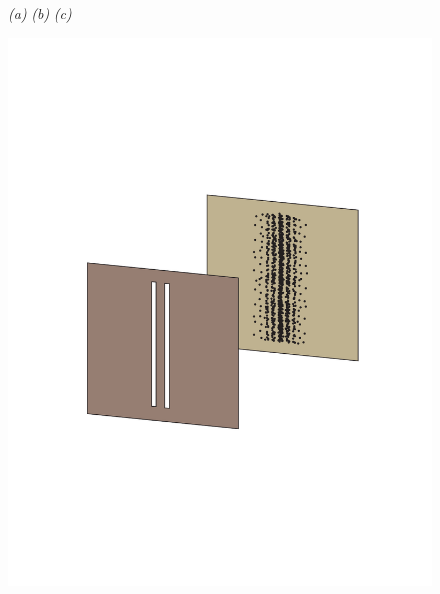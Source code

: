 \documentclass[3p,sort&compress]{elsarticle}
\begin{document}
\begin{figure}
{\footnotesize \emph{(a)} \hspace{5cm} \emph{(b)} \hspace{5cm} \emph{(c)} }

\centering
\includegraphics[scale=.33]{dsint_new3.pdf} \hspace{.7cm}

\end{figure}
\end{document}
